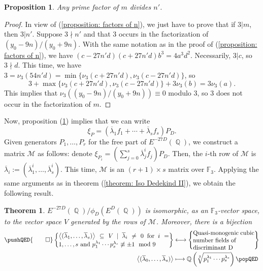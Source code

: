 \documentclass[oneside]{amsart}
\newcommand{\FF}{\mathbb{F}}
\newcommand{\scprod}[1]{\left\langle #1 \right\rangle}
\newcommand{\embrace}[3]{\left#1 #3 \right#2}
\newcommand{\lpar}[1]{\embrace{(}{)}{#1}}
\DeclareMathOperator{\QQ}{\mathbb{Q}}
\newtheorem{proposition}[X]{Proposition}
\newtheorem{theorem}[X]{Theorem}
\theoremstyle{definition}
\begin{document}
\begin{proposition}
    \label{proposition: factors of n Dedekind I}
    Any prime factor of $m$ divides $n'$.
\end{proposition}
\begin{proof}
    In view of (\ref{proposition: factors of n}), we just have to prove that if $3|m$, then $3|n'$. Suppose $3\nmid n'$ and that 3 occurs in the factorization of $(y_0 - 9n)/(y_0 + 9n)$. With the same notation as in the proof of (\ref{proposition: factors of n}), we have $(c - 27n'd)(c + 27n'd)b^3 = 4a^3d^2$. Necessarily, $3|c$, so $3\nmid d$. This time, we have $3 = \nu_3(54n'd) = \min\{\nu_3(c + 27n'd), \nu_3(c - 27n'd)\}$, so 
    $$
    3 + \max\{\nu_3(c + 27n'd), \nu_3(c - 27n'd)\} + 3\nu_3(b) = 3\nu_3(a).
    $$
    This implies that $\nu_3((y_0 - 9n)/(y_0 + 9n))\equiv 0$ modulo 3, so 3 does not occur in the factorization of $m$.
\end{proof}
Now, proposition (\ref{proposition: factors of n Dedekind I}) implies that we can write
$$
\xi_P = (\overline{\lambda}_1f_1 + \cdots + \overline{\lambda}_{s}f_{s})P_D.
$$
Given generators $P_1, \dots, P_r$ for the free part of $E^{-27D}(\QQ)$, we construct a matrix $\mathcal{M}$ as follows: denote $\xi_{P_i} = (\sum_{j = 0}^{s}\overline{\lambda}_j^if_j)P_D$. Then, the $i$-th row of $\mathcal{M}$ is $\overline{\lambda}_i := (\overline{\lambda}_1^i, \dots, \overline{\lambda}_{s}^i)$. This time, $\mathcal{M}$ is an $(r + 1)\times s$ matrix over $\mathbb{F}_3$. Applying the same arguments as in theorem (\ref{theorem: Iso Dedekind II}), we obtain the following result. 
\begin{theorem}
    \label{theorem: Iso Dedekind I}
    $E^{-27D}(\QQ)/\phi_D(E^D(\QQ))$ is isomorphic, as an $\FF_3$-vector space, to the vector space $V$ generated by the rows of $\mathcal{M}$. Moreover, there is a bijection
    \begin{align*}
        \pushQED{\qed}
        \left\{\parbox{18em}{$\scprod{(\overline{\lambda}_1, \dots, \overline{\lambda}_{s})}\subseteq V \ | \ \overline{\lambda}_i \neq 0$ \textnormal{for} $i = 1, \dots, s \textnormal{ and }p_1^{\lambda_1}\cdots p_{s}^{\lambda_{s}}\not\equiv\pm 1\mod 9$}\right\}&\longleftrightarrow
        \left\{\parbox{10em}{\textnormal{Quasi-monogenic cubic number fields of\\ discriminant }D}\right\}\\
        \scprod{(\overline{\lambda}_0, \dots, \overline{\lambda}_{s})}&\longmapsto\QQ\lpar{\sqrt[3]{p_1^{\lambda_1}\cdots p_{s}^{\lambda_{s}}}}\qedhere
        \popQED
    \end{align*}
\end{theorem}
\end{document}
